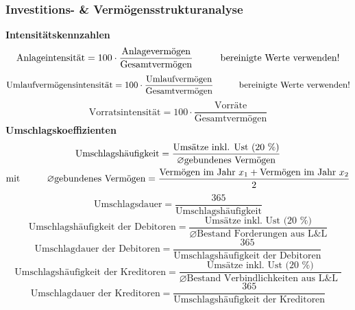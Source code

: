 \documentclass[11pt]{scrartcl}
\begin{document}
\subsubsection{Investitions- \& Vermögensstrukturanalyse}
\textbf{Intensitätskennzahlen}
\begin{equation}
    \text{Anlageintensität} = 100\cdot\frac{\text{Anlagevermögen}}{\text{Gesamtvermögen}} \hspace*{1cm} \text{bereinigte Werte verwenden!}
\end{equation}
\begin{equation}
    \text{Umlaufvermögensintensität} = 100\cdot\frac{\text{Umlaufvermögen}}{\text{Gesamtvermögen}} \hspace*{1cm} \text{bereinigte Werte verwenden!}
\end{equation}
\begin{equation}
    \text{Vorratsintensität} = 100\cdot\frac{\text{Vorräte}}{\text{Gesamtvermögen}} 
\end{equation}
\textbf{Umschlagskoeffizienten}
\begin{multline}
    \text{Umschlagshäufigkeit} = \frac{\text{Umsätze inkl. Ust (20 \%)}}{\varnothing\text{gebundenes Vermögen}} \\ \text{mit} \hspace*{1cm} \varnothing\text{gebundenes Vermögen} = \frac{\text{Vermögen im Jahr } x_1+\text{Vermögen im Jahr } x_2}{2}
\end{multline}
\begin{equation}
    \text{Umschlagsdauer} = \frac{365}{\text{Umschlagshäufigkeit}}
\end{equation}
\begin{equation}
    \text{Umschlagshäufigkeit der Debitoren} = \frac{\text{Umsätze inkl. Ust (20 \%)}}{\varnothing\text{Bestand Forderungen aus L\&L}}
\end{equation}
\begin{equation}
    \text{Umschlagdauer der Debitoren} = \frac{365}{\text{Umschlagshäufigkeit der Debitoren}}
\end{equation}
\begin{equation}
    \text{Umschlagshäufigkeit der Kreditoren} = \frac{\text{Umsätze inkl. Ust (20 \%)}}{\varnothing\text{Bestand Verbindlichkeiten aus L\&L }}
\end{equation}
\begin{equation}
    \text{Umschlagdauer der Kreditoren} = \frac{365}{\text{Umschlagshäufigkeit der Kreditoren}}
\end{equation}
\end{document}
